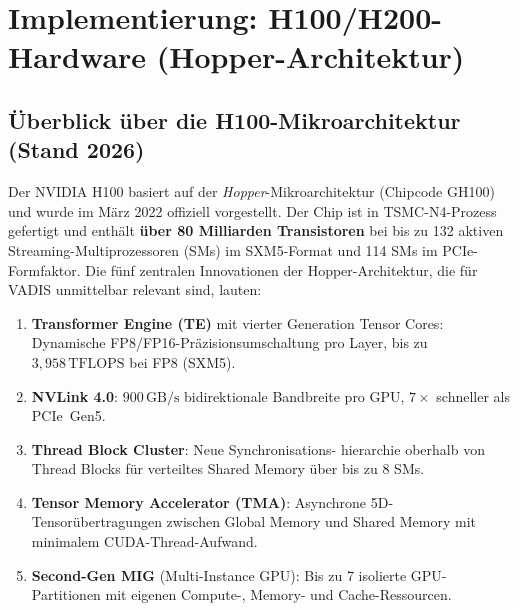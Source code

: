 ﻿\documentclass[12pt,a4paper]{article}
\begin{document}
\section{Implementierung: H100/H200-Hardware (Hopper-Architektur)}
\label{sec:nvidia}

\subsection{Überblick über die H100-Mikroarchitektur (Stand 2026)}

Der NVIDIA H100 basiert auf der \emph{Hopper}-Mikroarchitektur
(Chipcode GH100) und wurde im März 2022 offiziell vorgestellt.
Der Chip ist in TSMC-N4-Prozess gefertigt und enthält
\textbf{über 80 Milliarden Transistoren} bei bis zu 132 aktiven
Streaming-Multiprozessoren (SMs) im SXM5-Format und 114 SMs
im PCIe-Formfaktor. Die fünf zentralen Innovationen der
Hopper-Architektur, die für VADIS unmittelbar relevant sind,
lauten:

\begin{enumerate}[leftmargin=1.4em, itemsep=2pt, topsep=4pt]
  \item \textbf{Transformer Engine (TE)} mit vierter Generation
        Tensor Cores: Dynamische FP8/FP16-Präzisionsumschaltung
        pro Layer, bis zu $3{,}958\,\text{TFLOPS}$ bei FP8 (SXM5).
  \item \textbf{NVLink 4.0}: $900\,\text{GB/s}$ bidirektionale
        Bandbreite pro GPU, $7\times$ schneller als PCIe~Gen5.
  \item \textbf{Thread Block Cluster}: Neue Synchronisations-
        hierarchie oberhalb von Thread Blocks für
        verteiltes Shared Memory über bis zu 8 SMs.
  \item \textbf{Tensor Memory Accelerator (TMA)}: Asynchrone
        5D-Tensorübertragungen zwischen Global Memory und
        Shared Memory mit minimalem CUDA-Thread-Aufwand.
  \item \textbf{Second-Gen MIG} (Multi-Instance GPU):
        Bis zu 7 isolierte GPU-Partitionen mit eigenen
        Compute-, Memory- und Cache-Ressourcen.
\end{enumerate}
\end{document}
